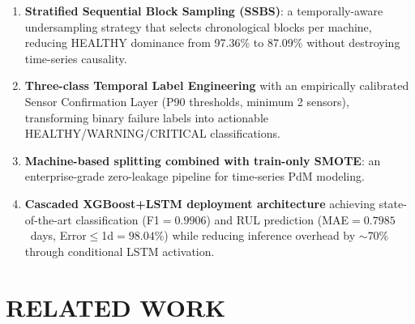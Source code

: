 \documentclass[conference]{IEEEtran}
\begin{document}
\begin{enumerate}
\item \textbf{Stratified Sequential Block Sampling (SSBS)}: a
  temporally-aware undersampling strategy that selects chronological blocks
  per machine, reducing HEALTHY dominance from 97.36\% to 87.09\% without
  destroying time-series causality.
\item \textbf{Three-class Temporal Label Engineering} with an empirically
  calibrated Sensor Confirmation Layer (P90 thresholds, minimum 2 sensors),
  transforming binary failure labels into actionable
  HEALTHY/WARNING/CRITICAL classifications.
\item \textbf{Machine-based splitting combined with train-only SMOTE}:
  an enterprise-grade zero-leakage pipeline for time-series PdM modeling.
\item \textbf{Cascaded XGBoost+LSTM deployment architecture} achieving
  state-of-the-art classification (F1$=0.9906$) and RUL prediction
  (MAE$=0.7985$~days, Error$\leq$1d$=98.04\%$) while reducing inference
  overhead by $\sim$70\% through conditional LSTM activation.
\end{enumerate}

\section{RELATED WORK}
\end{document}

